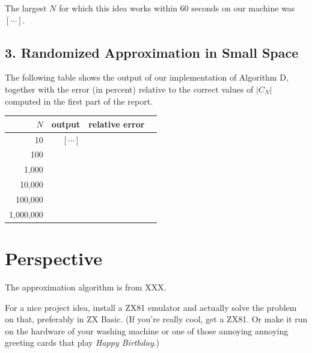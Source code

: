 \documentclass{tufte-handout}
\begin{document}
The largest $N$ for which this idea works within 60 seconds on our
machine was $[\cdots]$.


\subsection{3. Randomized Approximation in Small Space}

The following table shows the output of our implementation of
Algorithm D, together with the error (in percent) relative to the
correct values of $|C_N|$ computed in the first part of the report.

\medskip
\begin{tabular}{rrrr}
  \toprule
  $N$ &   output & relative error \\
  \midrule
  10 & $[\cdots]$ &
  \\
  100 & \\
  1,000 & \\
  10,000 & \\
  100,000 & \\
  1,000,000 & \\
  \bottomrule
\end{tabular}


\newpage
\section{Perspective}

The approximation algorithm is from XXX.

For a nice project idea, install a ZX81 emulator and actually solve
the problem on that, preferably in ZX Basic.
(If you're really cool, get a ZX81.
Or make it run on the hardware of your washing machine or one of those
annoying annoying greeting cards that play \emph{Happy Birthday}.)
\end{document}
